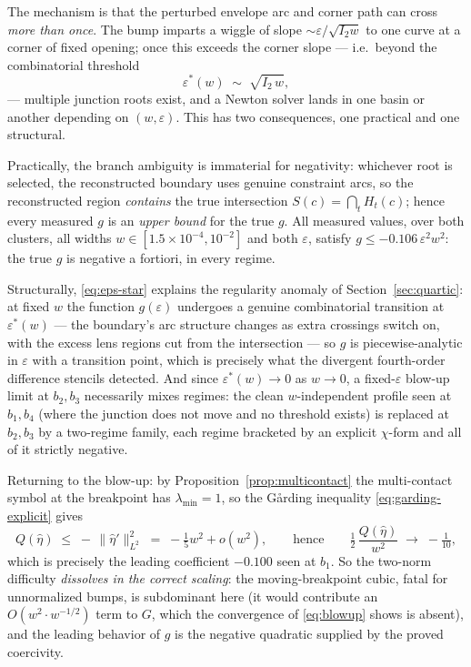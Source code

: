 \documentclass[11pt]{amsart}
\theoremstyle{plain}
\theoremstyle{definition}
\begin{document}
The mechanism is that the perturbed envelope arc and corner path can
cross \emph{more than once}.  The bump imparts a wiggle of slope
$\sim\varepsilon/\sqrt{I_{2}w}$ to one curve at a corner of fixed
opening; once this exceeds the corner slope --- i.e.\ beyond the
combinatorial threshold
\begin{equation}\label{eq:eps-star}
   \varepsilon^{*}(w) \;\sim\; \sqrt{I_{2}\,w},
\end{equation}
--- multiple junction roots exist, and a Newton solver lands in one
basin or another depending on $(w,\varepsilon)$.  This has two
consequences, one practical and one structural.

Practically, the branch ambiguity is immaterial for negativity:
whichever root is selected, the reconstructed boundary uses genuine
constraint arcs, so the reconstructed region \emph{contains} the true
intersection $S(c)=\bigcap_{t}H_{t}(c)$; hence every measured $g$ is an
\emph{upper bound} for the true $g$.  All measured values, over both
clusters, all widths $w\in[1.5\times10^{-4},10^{-2}]$ and both
$\varepsilon$, satisfy $g \leq -0.106\,\varepsilon^{2}w^{2}$: the true
$g$ is negative a fortiori, in every regime.

Structurally, \eqref{eq:eps-star} explains the regularity anomaly of
Section~\ref{sec:quartic}: at fixed $w$ the function
$g(\varepsilon)$ undergoes a genuine combinatorial transition at
$\varepsilon^{*}(w)$ --- the boundary's arc structure changes as extra
crossings switch on, with the excess lens regions cut from the
intersection --- so $g$ is piecewise-analytic in $\varepsilon$ with a
transition point, which is precisely what the divergent fourth-order
difference stencils detected.  And since $\varepsilon^{*}(w)\to0$ as
$w\to0$, a fixed-$\varepsilon$ blow-up limit at $b_{2},b_{3}$
necessarily mixes regimes: the clean $w$-independent profile seen at
$b_{1},b_{4}$ (where the junction does not move and no threshold
exists) is replaced at $b_{2},b_{3}$ by a two-regime family, each
regime bracketed by an explicit $\chi$-form and all of it strictly
negative.

\medskip
Returning to the blow-up: by
Proposition~\ref{prop:multicontact} the multi-contact symbol at the
breakpoint has $\lambda_{\min}=1$, so the G\aa rding inequality
\eqref{eq:garding-explicit} gives
\begin{equation}\label{eq:blowup-garding}
   Q(\hat\eta) \;\leq\; -\,\|\hat\eta'\|^{2}_{L^{2}}
     \;=\; -\tfrac15 w^{2} + o(w^{2}),
   \qquad\text{hence}\qquad
   \tfrac12\,\frac{Q(\hat\eta)}{w^{2}} \;\to\; -\tfrac1{10},
\end{equation}
which is precisely the leading coefficient $-0.100$ seen at $b_{1}$.
So the two-norm difficulty \emph{dissolves in the correct scaling}: the
moving-breakpoint cubic, fatal for unnormalized bumps, is subdominant
here (it would contribute an $O(w^{2}\!\cdot\!w^{-1/2})$ term to
$G$, which the convergence of \eqref{eq:blowup} shows is absent), and
the leading behavior of $g$ is the negative quadratic supplied by the
proved coercivity.
\end{document}
